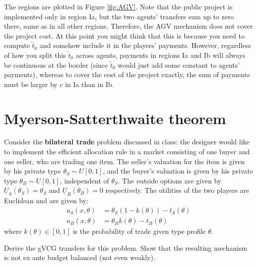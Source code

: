 \documentclass[a4paper]{article}
\begin{document}
The regions are plotted in Figure \ref{fig:AGV}. Note that the public project is implemented only in region Ia, but the two agents' transfers sum up to zero there, same as in all other regions. Therefore, the AGV mechanism does not cover the project cost.
At this point you might think that this is because you need to compute $\tilde{t}_0$ and somehow include it in the players' payments. However, regardless of how you split this $\tilde{t}_0$ across agents, payments in regions Ia and Ib will always be continuous at the border (since $\tilde{t}_0$ would just add some constant to agents' payments), whereas to cover the cost of the project exactly, the sum of payments must be larger by $c$ in Ia than in Ib.
\fi 



\section{Myerson-Satterthwaite theorem}

Consider the \textbf{bilateral trade} problem discussed in class: the designer would like to implement the efficient allocation rule in a market consisting of one buyer and one seller, who are trading one item. The seller's valuation for the item is given by his private type $\theta_S \sim U[0,1]$, and the buyer's valuation is given by his private type $\theta_B \sim U[0,1]$, independent of $\theta_S$. The outside options are given by $\underline{U}_S({\theta}_S)={\theta}_S$ and $\underline{U}_B({\theta}_B)=0$ respectively. The utilities of the two players are Euclidean and are given by:
\begin{align*}
	u_S(x,\theta) &= \theta_S (1-k(\theta)) - t_S(\theta)
	\\
	u_B(x,\theta) &= \theta_B k(\theta) - t_B(\theta)
\end{align*}
where $k(\theta) \in [0,1]$ is the probability of trade given type profile $\theta$.

Derive the gVCG transfers for this problem. Show that the resulting mechanism is not ex ante budget balanced (not even weakly).
\end{document}
